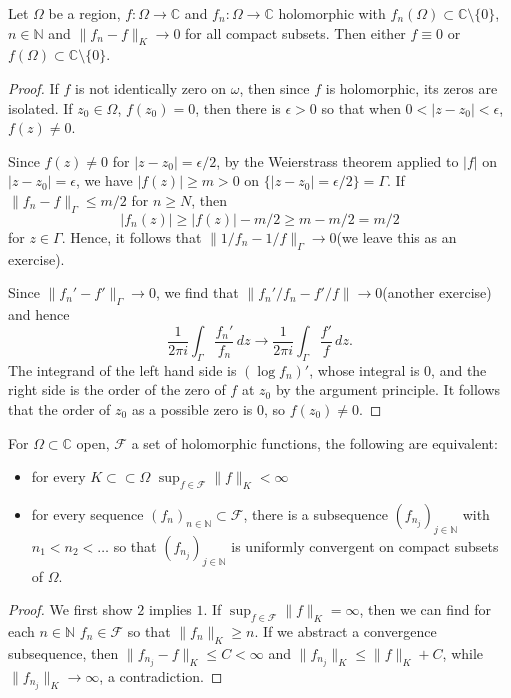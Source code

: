 \documentclass[12pt]{scrartcl}
\newcommand{\N}{\mathbb{N}}
\newcommand{\C}{\mathbb C}
\let \mc \mathcal
\begin{document}
\begin{thm}[Hurwitz] Let $\Omega$ be a region, $f : \Omega \to \C$ and $f_n: \Omega \to \C$ holomorphic with $f_n(\Omega) \subset \C \setminus \{0\}$, $n \in \N$ and $\|f_n - f\|_K \to 0$
 for all compact subsets.  Then either $f \equiv 0$ or $f(\Omega) \subset \C \setminus \{0\}$.
 \end{thm}
\begin{proof}
If $f$ is not identically zero on $\omega$, then since $f$ is holomorphic, its zeros are isolated.  If $z_0 \in \Omega$, $f(z_0) = 0$, then there is $\epsilon > 0$ so that when $0 < |z - z_0| <\epsilon$, $f(z) \ne 0$. 

Since $f(z) \ne 0$ for $|z - z_0| = \epsilon/2$, by the Weierstrass theorem applied to $|f|$ on $|z - z_0| = \epsilon$, we have $|f(z)| \ge m > 0$ on $\{|z - z_0| = \epsilon/2\} = \Gamma$.  If $\|f_n - f\|_\Gamma \le m/2$ for $n \ge N$, then $$|f_n(z)| \ge |f(z)| - m/2 \ge m - m/2 = m/2$$ for $z \in \Gamma$.  Hence, it follows that $\|1 /f_n - 1/f\|_\Gamma \to 0$(we leave this as an exercise).

Since $\|f_n' - f'\|_\Gamma \to 0$, we find that $\|f_n'/f_n - f'/f\| \to 0$(another exercise) and hence
$$\frac{1}{2\pi i} \int_\Gamma \frac{f_n'}{f_n}\,dz \to \frac{1}{2\pi i}\int_\Gamma \frac{f'}{f}\,dz.$$
The integrand of the left hand side is $(\log f_n)'$, whose integral is $0$, and the right side is the order of the zero of $f$ at $z_0$ by the argument principle.    It follows that the order of $z_0$ as a possible zero is $0$, so $f(z_0) \ne 0$.
\end{proof}

\begin{thm} For $\Omega \subset \C$ open, $\mc F$
 a set of holomorphic functions, the following are equivalent:
 \begin{itemize}
 \item for every $K \subset \subset \Omega$ $\sup_{f \in \mc F} \|f\|_K < \infty$
 \item for every sequence $(f_n)_{n \in \N} \subset \mc F$, there is a subsequence $(f_{n_j})_{j \in \N}$ with $n_1 < n_2 < \dots$ so that $(f_{n_j})_{j \in \N}$ is uniformly convergent on compact subsets of $\Omega$.
 \end{itemize}
 \end{thm}
 \begin{proof}
 We first show $2$ implies $1$.  If $\sup_{f \in \mc F} \|f\|_K = \infty$, then we can find for each $n \in \N$ $f_n \in \mc F$ so that $\|f_n\|_K \ge n.$  If we abstract a convergence subsequence, then $\|f_{n_j} - f\|_K \le C < \infty$ and $\|f_{n_j}\|_K \le \|f\|_K + C$, while $\|f_{n_j}\|_K \to \infty$, a contradiction.
 \end{proof}
 \pagebreak
\end{document}
